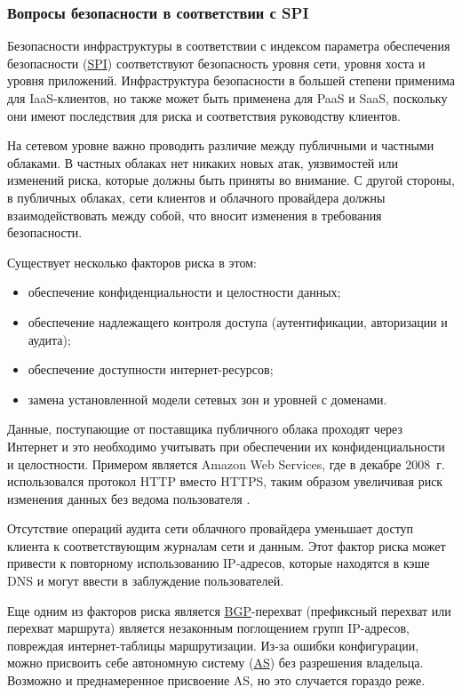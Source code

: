 \subsubsection{Вопросы безопасности в соответствии с SPI}

Безопасности инфраструктуры в соответствии с индексом параметра обеспечения безопасности (\hyperlink{spi}{SPI}) соответствуют безопасность уровня сети, уровня хоста и уровня приложений.
Инфраструктура безопасности в большей степени применима для IaaS-клиентов, но также может быть применена для PaaS и SaaS, поскольку они имеют последствия для риска и соответствия руководству клиентов.

На сетевом уровне важно проводить различие между публичными и частными облаками.
В частных облаках нет никаких новых атак, уязвимостей или изменений риска, которые должны быть приняты во внимание.
С другой стороны, в публичных облаках, сети клиентов и облачного провайдера должны взаимодействовать между собой, что вносит изменения в требования безопасности.

Существует несколько факторов риска в этом:
\begin{itemize}
  \item обеспечение конфиденциальности и целостности данных;
  \item обеспечение надлежащего контроля доступа (аутентификации, авторизации и аудита);
  \item обеспечение доступности интернет-ресурсов;
  \item замена установленной модели сетевых зон и уровней с доменами.
\end{itemize}

Данные, поступающие от поставщика публичного облака проходят через Интернет и это необходимо учитывать при обеспечении их конфиденциальности и целостности.
Примером является Amazon Web Services, где в декабре 2008~г. использовался протокол HTTP вместо HTTPS, таким образом увеличивая риск изменения данных без ведома пользователя \cite{aws}.

Отсутствие операций аудита сети облачного провайдера уменьшает доступ клиента к соответствующим журналам сети и данным.
Этот фактор риска может привести к повторному использованию IP-адресов, которые находятся в кэше DNS и могут ввести в заблуждение пользователей.

Еще одним из факторов риска является \hyperlink{bgp}{BGP}-перехват (префиксный перехват или перехват маршрута) является незаконным поглощением групп IP-адресов, повреждая интернет-таблицы маршрутизации.
Из-за ошибки конфигурации, можно присвоить себе автономную систему (\hyperlink{as}{AS}) без разрешения владельца.
Возможно и преднамеренное присвоение AS, но это случается гораздо реже.

